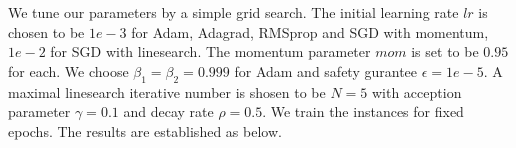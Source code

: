 \documentclass{article}
\begin{document}
We tune our parameters by a simple grid search. The initial learning rate $lr$ is chosen to be $1e-3$ for Adam, Adagrad, RMSprop and SGD with momentum, $1e-2$ for SGD with linesearch. The momentum parameter $mom$ is set to be $0.95$ for each. We choose $\beta_1=\beta_2=0.999$ for Adam and safety gurantee $\epsilon=1e-5$. A maximal linesearch iterative number is shosen to be $N=5$ with acception parameter $\gamma=0.1$ and decay rate $\rho=0.5$. We train the instances for fixed epochs. The results are established as below.
\end{document}
